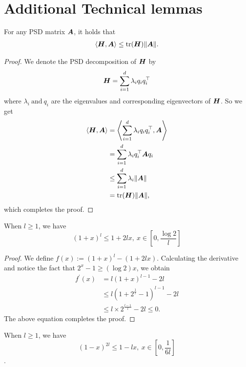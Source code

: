 \section{Additional Technical lemmas}
\begin{lemma} \label{lem:dot-product}For any PSD matrix ${\bm{A}}$, it holds that
\begin{align*}
    \left\langle {\bm{H}},{\bm{A}}\right\rangle \leq \text{tr}({\bm{H}})\|{\bm{A}}\|.
\end{align*}
\end{lemma}
\begin{proof}
    We denote the PSD decomposition of ${\bm{H}}$ by 
    \[{\bm{H}} = \sum_{i=1}^d\lambda_iq_iq_i^{\top}\]
    where $\lambda_i ~\text{and} ~q_i$ are the eigenvalues and corresponding eigenvectors of ${\bm{H}}$.
    So we get
    \begin{align*}
        \left\langle {\bm{H}},{\bm{A}}\right\rangle&=\left\langle \sum_{i=1}^d\lambda_iq_iq_i^{\top},{\bm{A}}\right\rangle \\        &=\sum_{i=1}^d\lambda_iq_i^{\top}{\bm{A}} q_i \\
        &\leq \sum_{i=1}^d\lambda_i\|{\bm{A}}\| \\
        &=\text{tr}({\bm{H}})\|{\bm{A}}\|,
    \end{align*}
    which completes the proof.
\end{proof}
\begin{lemma} \label{lem:numerical-power}
    When $l\geq 1$, we have \[(1+x)^l \leq 1+2lx, \ x\in [0, \frac{\log 2}{l}]\]
\end{lemma}
\begin{proof}
    We define $f(x):=(1+x)^l-(1+2lx)$.
    Calculating the derivative and notice the fact that $2^x - 1 \geq (\log2)x$, we obtain
    \begin{align*}
        f^{'}(x)&=l(1+x)^{l-1}-2l \\
        &\leq l(1+2^{\frac{1}{l}}-1)^{l-1}-2l \\
        &\leq l\times2^{\frac{l-1}{l}} -2l \leq 0.
    \end{align*}
    The above equation completes the proof.
\end{proof}
\begin{lemma} \label{lem:numerical-power-minus}
    When $l\geq 1$, we have \[(1-x)^{2l} \leq 1-lx, \ x\in [0, \frac{1}{6l}]\].
\end{lemma}
